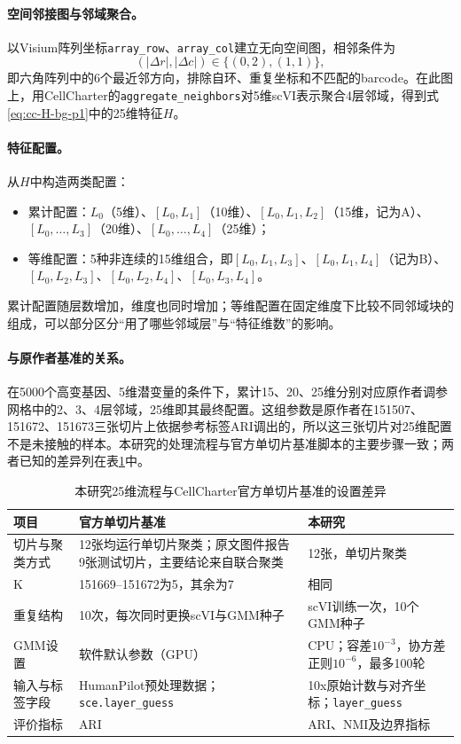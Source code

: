 \paragraph{空间邻接图与邻域聚合。}以Visium阵列坐标\texttt{array\_row}、\texttt{array\_col}建立无向空间图，相邻条件为
\begin{equation}
(|\Delta r|,|\Delta c|)\in\{(0,2),(1,1)\},
\label{eq:cc-hex-p1}
\end{equation}
即六角阵列中的6个最近邻方向，排除自环、重复坐标和不匹配的barcode。在此图上，用CellCharter的\texttt{aggregate\_neighbors}对5维scVI表示聚合4层邻域，得到式\eqref{eq:cc-H-bg-p1}中的25维特征$H$。

\paragraph{特征配置。}从$H$中构造两类配置：
\begin{itemize}
  \item 累计配置：$L_0$（5维）、$[L_0,L_1]$（10维）、$[L_0,L_1,L_2]$（15维，记为A）、$[L_0,\ldots,L_3]$（20维）、$[L_0,\ldots,L_4]$（25维）；
  \item 等维配置：5种非连续的15维组合，即$[L_0,L_1,L_3]$、$[L_0,L_1,L_4]$（记为B）、$[L_0,L_2,L_3]$、$[L_0,L_2,L_4]$、$[L_0,L_3,L_4]$。
\end{itemize}
累计配置随层数增加，维度也同时增加；等维配置在固定维度下比较不同邻域块的组成，可以部分区分“用了哪些邻域层”与“特征维数”的影响。

\paragraph{与原作者基准的关系。}在5000个高变基因、5维潜变量的条件下，累计15、20、25维分别对应原作者调参网格中的2、3、4层邻域，25维即其最终配置\cite{varrone2024,cellcharteranalyses2024}。这组参数是原作者在151507、151672、151673三张切片上依据参考标签ARI调出的，所以这三张切片对25维配置不是未接触的样本。本研究的处理流程与官方单切片基准脚本的主要步骤一致；两者已知的差异列在表\ref{tab:cc-official-protocol-p1}中。

\begin{table}[htbp]
\centering
\caption{本研究25维流程与CellCharter官方单切片基准的设置差异}
\label{tab:cc-official-protocol-p1}
\small
\begin{tabularx}{\linewidth}{p{2.4cm}XX}
\toprule
项目 & 官方单切片基准\cite{cellcharteranalyses2024} & 本研究\\
\midrule
切片与聚类方式 & 12张均运行单切片聚类；原文图件报告9张测试切片，主要结论来自联合聚类 & 12张，单切片聚类\\
K & 151669--151672为5，其余为7 & 相同\\
重复结构 & 10次，每次同时更换scVI与GMM种子 & scVI训练一次，10个GMM种子\\
GMM设置 & 软件默认参数（GPU） & CPU；容差$10^{-3}$，协方差正则$10^{-6}$，最多100轮\\
输入与标签字段 & HumanPilot预处理数据；\texttt{sce.layer\_guess} & 10x原始计数与对齐坐标；\texttt{layer\_guess}\\
评价指标 & ARI & ARI、NMI及边界指标\\
\bottomrule
\end{tabularx}
\end{table}


